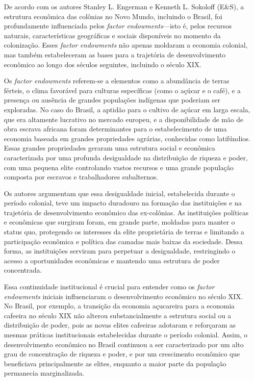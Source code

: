 \documentclass[a4paper,12pt]{article}[abntex2]
\begin{document}
De acordo com os autores Stanley L. Engerman e Kenneth L. Sokoloff (E\&S), a estrutura econômica das colônias no Novo Mundo, incluindo o Brasil, foi profundamente influenciada pelos \textit{factor endowments}—isto é, pelos recursos naturais, características geográficas e sociais disponíveis no momento da colonização. Esses \textit{factor endowments} não apenas moldaram a economia colonial, mas também estabeleceram as bases para a trajetória de desenvolvimento econômico ao longo dos séculos seguintes, incluindo o século XIX.

Os \textit{factor endowments} referem-se a elementos como a abundância de terras férteis, o clima favorável para culturas específicas (como o açúcar e o café), e a presença ou ausência de grandes populações indígenas que poderiam ser exploradas. No caso do Brasil, a aptidão para o cultivo de açúcar em larga escala, que era altamente lucrativo no mercado europeu, e a disponibilidade de mão de obra escrava africana foram determinantes para o estabelecimento de uma economia baseada em grandes propriedades agrárias, conhecidas como latifúndios. Essas grandes propriedades geraram uma estrutura social e econômica caracterizada por uma profunda desigualdade na distribuição de riqueza e poder, com uma pequena elite controlando vastos recursos e uma grande população composta por escravos e trabalhadores subalternos.

Os autores argumentam que essa desigualdade inicial, estabelecida durante o período colonial, teve um impacto duradouro na formação das instituições e na trajetória de desenvolvimento econômico das ex-colônias. As instituições políticas e econômicas que surgiram foram, em grande parte, moldadas para manter o status quo, protegendo os interesses da elite proprietária de terras e limitando a participação econômica e política das camadas mais baixas da sociedade. Dessa forma, as instituições serviram para perpetuar a desigualdade, restringindo o acesso a oportunidades econômicas e mantendo uma estrutura de poder concentrada.

Essa continuidade institucional é crucial para entender como os \textit{factor endowments} iniciais influenciaram o desenvolvimento econômico no século XIX. No Brasil, por exemplo, a transição da economia açucareira para a economia cafeeira no século XIX não alterou substancialmente a estrutura social ou a distribuição de poder, pois as novas elites cafeeiras adotaram e reforçaram as mesmas práticas institucionais estabelecidas durante o período colonial. Assim, o desenvolvimento econômico no Brasil continuou a ser caracterizado por um alto grau de concentração de riqueza e poder, e por um crescimento econômico que beneficiava principalmente as elites, enquanto a maior parte da população permanecia marginalizada.
\end{document}
